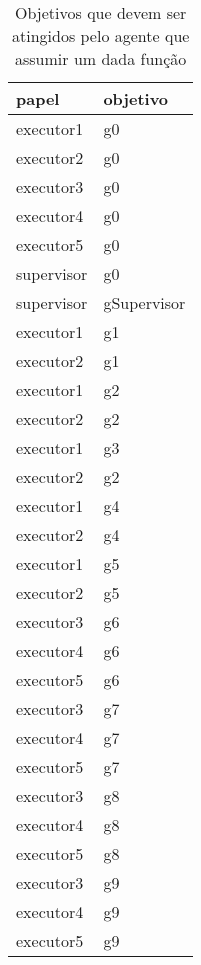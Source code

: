 \begin{table}[H]
\centering
{}
\begin{tabular}{|l|l|}
\hline
\textbf{papel} & \textbf{objetivo} \\ \hline
executor1 & g0 \\ \hline
executor2 & g0 \\ \hline
executor3 & g0 \\ \hline
executor4 & g0 \\ \hline
executor5 & g0 \\ \hline
supervisor & g0 \\ \hline
supervisor & gSupervisor \\ \hline
executor1 & g1 \\ \hline
executor2 & g1 \\ \hline
executor1 & g2 \\ \hline
executor2 & g2 \\ \hline
executor1 & g3 \\ \hline
executor2 & g2 \\ \hline
executor1 & g4 \\ \hline
executor2 & g4 \\ \hline
executor1 & g5 \\ \hline
executor2 & g5 \\ \hline
executor3 & g6 \\ \hline
executor4 & g6 \\ \hline
executor5 & g6 \\ \hline
executor3 & g7 \\ \hline
executor4 & g7 \\ \hline
executor5 & g7 \\ \hline
executor3 & g8 \\ \hline
executor4 & g8 \\ \hline
executor5 & g8 \\ \hline
executor3 & g9 \\ \hline
executor4 & g9 \\ \hline
executor5 & g9 \\ \hline
\end{tabular}
\caption{Objetivos que devem ser atingidos pelo agente que assumir um dada função}
\label{deontic1}
\end{table}

